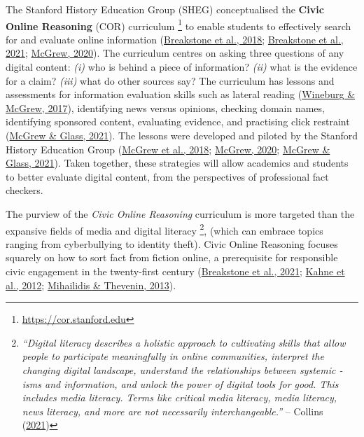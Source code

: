 \documentclass[letterpaper, nobind]{templates/ociamthesis}
\begin{document}
The Stanford History Education Group (SHEG) conceptualised the \textbf{Civic
Online Reasoning} (COR) curriculum \footnote{\url{https://cor.stanford.edu}} to enable students to
effectively search for and evaluate online information
(\protect\hyperlink{ref-breakstone2018we}{Breakstone et al., 2018}; \protect\hyperlink{ref-breakstone2021students}{Breakstone et al., 2021}; \protect\hyperlink{ref-mcgrew2020learning}{McGrew, 2020}). The
curriculum centres on asking three questions of any digital content:
\emph{(i)} who is behind a piece of information? \emph{(ii)} what is the evidence
for a claim? \emph{(iii)} what do other sources say? The curriculum has
lessons and assessments for information evaluation skills such as
lateral reading (\protect\hyperlink{ref-wineburg2017lateral}{Wineburg \& McGrew, 2017}), identifying news versus
opinions, checking domain names, identifying sponsored content,
evaluating evidence, and practising click restraint (\protect\hyperlink{ref-mcgrew2021click}{McGrew \& Glass, 2021}).
The lessons were developed and piloted by the Stanford History Education
Group (\protect\hyperlink{ref-mcgrew2018can}{McGrew et al., 2018}; \protect\hyperlink{ref-mcgrew2020learning}{McGrew, 2020}; \protect\hyperlink{ref-mcgrew2021click}{McGrew \& Glass, 2021}). Taken
together, these strategies will allow academics and students to better
evaluate digital content, from the perspectives of professional fact
checkers.

The purview of the \emph{Civic Online Reasoning} curriculum is more targeted
than the expansive fields of media and digital literacy \footnote{
  \emph{``Digital literacy describes a holistic approach to cultivating skills that allow people to participate meaningfully in online communities, interpret the changing digital landscape, understand the relationships between systemic -isms and information, and unlock the power of digital tools for good. This includes media literacy. Terms like critical media literacy, media literacy, news literacy, and more are not necessarily interchangeable.''} -- Collins (\protect\hyperlink{ref-collins2021reimagining}{2021})}, (which can embrace topics ranging from cyberbullying to identity theft).
Civic Online Reasoning focuses squarely on how to sort fact from fiction
online, a prerequisite for responsible civic engagement in the
twenty-first century (\protect\hyperlink{ref-breakstone2021students}{Breakstone et al., 2021}; \protect\hyperlink{ref-kahne2012digital}{Kahne et al., 2012}; \protect\hyperlink{ref-mihailidis2013media}{Mihailidis \& Thevenin, 2013}).
\end{document}
